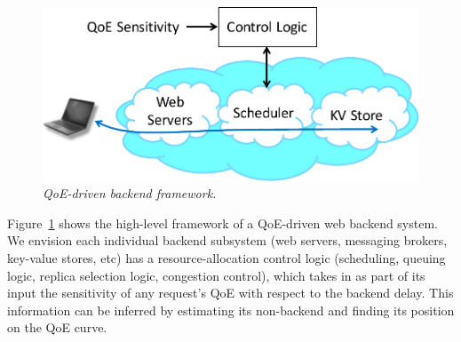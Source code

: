 \begin{figure}
	\centering
	\includegraphics[width=1.0\textwidth]{figs/framework.pdf}
	\caption{\em QoE-driven backend framework.}
	\label{fig:framework}
\end{figure}
 Figure~\ref{fig:framework} shows the high-level framework of a QoE-driven web backend system.
We envision each individual backend subsystem (web servers, messaging brokers, key-value stores, etc) has a resource-allocation control logic (\eg scheduling, queuing logic, replica selection logic, congestion control), which takes in as part of its input the sensitivity of any request's QoE with respect to the backend delay.
This information can be inferred by estimating its non-backend and finding its position on the QoE curve. 


